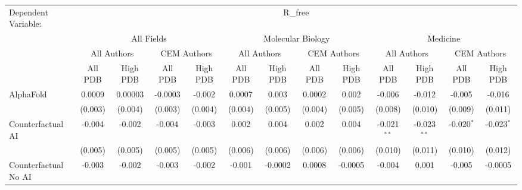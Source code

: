 \begingroup
\centering
\begin{tabular}{lcccccccccccc}
   \tabularnewline \midrule \midrule
   Dependent Variable: & \multicolumn{12}{c}{R\_free}\\
 & \multicolumn{4}{c}{All Fields} & \multicolumn{4}{c}{Molecular Biology} & \multicolumn{4}{c}{Medicine} \\
\cmidrule(lr){2-5} \cmidrule(lr){6-9} \cmidrule(lr){10-13}
 & \multicolumn{2}{c}{All Authors} & \multicolumn{2}{c}{CEM Authors} & \multicolumn{2}{c}{All Authors} & \multicolumn{2}{c}{CEM Authors} & \multicolumn{2}{c}{All Authors} & \multicolumn{2}{c}{CEM Authors} \\
\cmidrule(lr){2-3} \cmidrule(lr){4-5} \cmidrule(lr){6-7} \cmidrule(lr){8-9} \cmidrule(lr){10-11} \cmidrule(lr){12-13}
 & \multicolumn{1}{c}{All PDB} & \multicolumn{1}{c}{High PDB} & \multicolumn{1}{c}{All PDB} & \multicolumn{1}{c}{High PDB} & \multicolumn{1}{c}{All PDB} & \multicolumn{1}{c}{High PDB} & \multicolumn{1}{c}{All PDB} & \multicolumn{1}{c}{High PDB} & \multicolumn{1}{c}{All PDB} & \multicolumn{1}{c}{High PDB} & \multicolumn{1}{c}{All PDB} & \multicolumn{1}{c}{High PDB} \\
\cmidrule(lr){2-2} \cmidrule(lr){3-3} \cmidrule(lr){4-4} \cmidrule(lr){5-5} \cmidrule(lr){6-6} \cmidrule(lr){7-7} \cmidrule(lr){8-8} \cmidrule(lr){9-9} \cmidrule(lr){10-10} \cmidrule(lr){11-11} \cmidrule(lr){12-12} \cmidrule(lr){13-13}
   AlphaFold                                                  & 0.0009         & 0.00003        & -0.0003        & -0.002        & 0.0007   & 0.003    & 0.0002   & 0.002    & -0.006         & -0.012        & -0.005         & -0.016\\   
                                                              & (0.003)        & (0.004)        & (0.003)        & (0.004)       & (0.004)  & (0.005)  & (0.004)  & (0.005)  & (0.008)        & (0.010)       & (0.009)        & (0.011)\\   
   Counterfactual AI                                          & -0.004         & -0.002         & -0.004         & -0.003        & 0.002    & 0.004    & 0.002    & 0.004    & -0.021$^{**}$  & -0.023$^{**}$ & -0.020$^{*}$   & -0.023$^{*}$\\   
                                                              & (0.005)        & (0.005)        & (0.005)        & (0.005)       & (0.006)  & (0.006)  & (0.006)  & (0.006)  & (0.010)        & (0.011)       & (0.010)        & (0.012)\\   
   Counterfactual No AI                                       & -0.003         & -0.002         & -0.003         & -0.002        & -0.001   & -0.0002  & 0.0008   & -0.0005  & -0.004         & 0.001         & -0.005         & -0.0005\\   

\end{tabular}
